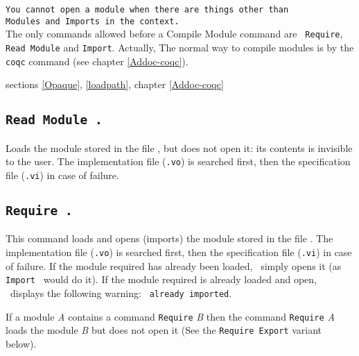 \begin{ErrMsgs}
\item \texttt{You cannot open a module when there are things other than}\\
  \texttt{Modules and Imports in the context.}\\ 
  The only commands allowed before a {Compile Module} command are {\tt
    Require},\\
  {\tt Read Module} and {\tt Import}. Actually, The normal way to
  compile modules is by the {\tt coqc} command (see chapter
  \ref{Addoc-coqc}).
\end{ErrMsgs}

\SeeAlso sections \ref{Opaque}, \ref{loadpath}, chapter
\ref{Addoc-coqc}

\subsection{\tt Read Module {\ident}.}
Loads the module stored in the file {\ident}, but does not open it:
its contents is invisible to the user. The implementation file
({\ident}{\tt.vo}) is searched first, then the specification file
({\ident}{\tt.vi}) in case of failure.

\subsection{\tt Require {\ident}.}
\label{Require}
This command loads and opens (imports) the module stored in the file
{\ident}. The implementation file ({\ident}{\tt .vo}) is searched first,
then the specification file ({\ident}{\tt .vi}) in case of failure.
If the module required has already been loaded, \Coq\ 
simply opens it (as {\tt Import {\ident}} would do it).
If the module required is already loaded and open, \Coq\ 
displays the following warning: {\tt {\ident} already imported}.

If a module {\it A} contains a command {\tt Require} {\it B} then the
command {\tt Require} {\it A} loads the module {\it B} but does not
open it (See the {\tt Require Export} variant below).

